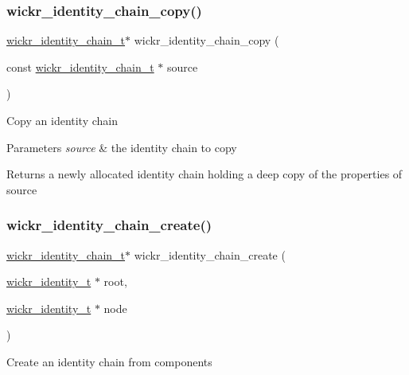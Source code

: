 \subsubsection{\texorpdfstring{wickr\_identity\_chain\_copy()}{wickr\_identity\_chain\_copy()}}
{\footnotesize\ttfamily \mbox{\hyperlink{structwickr__identity__chain}{wickr\+\_\+identity\+\_\+chain\+\_\+t}}$\ast$ wickr\+\_\+identity\+\_\+chain\+\_\+copy (\begin{DoxyParamCaption}\item[{const \mbox{\hyperlink{structwickr__identity__chain}{wickr\+\_\+identity\+\_\+chain\+\_\+t}} $\ast$}]{source }\end{DoxyParamCaption})}

Copy an identity chain


\begin{DoxyParams}{Parameters}
{\em source} & the identity chain to copy \\
\hline
\end{DoxyParams}
\begin{DoxyReturn}{Returns}
a newly allocated identity chain holding a deep copy of the properties of \textquotesingle{}source\textquotesingle{} 
\end{DoxyReturn}
\mbox{\label{group__wickr__identity_ga79551385194ba6b044b676ce5c7400e6}} 
\subsubsection{\texorpdfstring{wickr\_identity\_chain\_create()}{wickr\_identity\_chain\_create()}}
{\footnotesize\ttfamily \mbox{\hyperlink{structwickr__identity__chain}{wickr\+\_\+identity\+\_\+chain\+\_\+t}}$\ast$ wickr\+\_\+identity\+\_\+chain\+\_\+create (\begin{DoxyParamCaption}\item[{\mbox{\hyperlink{structwickr__identity}{wickr\+\_\+identity\+\_\+t}} $\ast$}]{root,  }\item[{\mbox{\hyperlink{structwickr__identity}{wickr\+\_\+identity\+\_\+t}} $\ast$}]{node }\end{DoxyParamCaption})}

Create an identity chain from components


